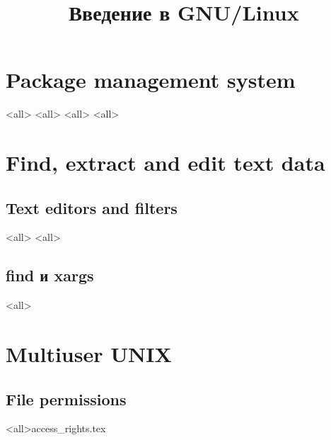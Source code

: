 

\title{Введение в GNU/Linux}








\begin{frame}
	\frametitle{}
	\titlepage
	\vspace{-0.5cm}
	\begin{center}
	\end{center}
\end{frame}




\section{Package management system}
\mode<all>{}
\mode<all>{}
\mode<all>{}
\mode<all>{}

\section{Find, extract and edit text data}

\subsection{Text editors and filters}
\mode<all>{}
\mode<all>{} %
\subsection{find и xargs}
\mode<all>{}


\section{Multiuser UNIX}
\subsection{File permissions}
\mode<all>{{access_rights.tex}}
